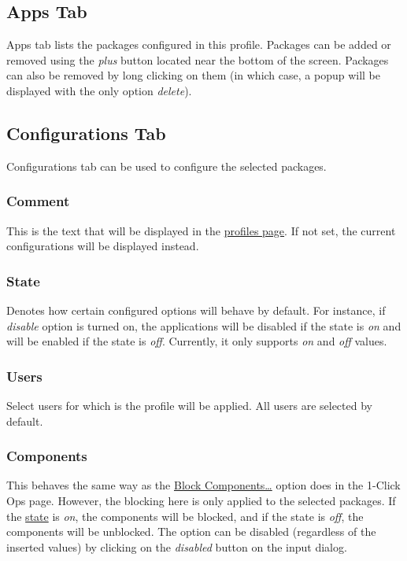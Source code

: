 \subsection{Apps Tab}\label{subsec:profile-apps-tab} %
Apps tab lists the packages configured in this profile. Packages can be added or removed using the \textit{plus}
button located near the bottom of the screen. Packages can also be removed by long clicking on them (in which case, a
popup will be displayed with the only option \textit{delete}).

\subsection{Configurations Tab}\label{subsec:profile-configurations-tab} %
Configurations tab can be used to configure the selected packages.

\subsubsection{Comment} %
This is the text that will be displayed in the \hyperref[sec:profiles-page]{profiles page}. If not set, the current
configurations will be displayed instead.

\subsubsection{State}\label{subsubsec:profile-state} %
Denotes how certain configured options will behave by default. For instance, if \textit{disable} option is turned on,
the applications will be disabled if the state is \textit{on} and will be enabled if the state is \textit{off}.
Currently, it only supports \textit{on} and \textit{off} values.

\subsubsection{Users} %
Select users for which is the profile will be applied. All users are selected by default.

\subsubsection{Components} %
This behaves the same way as the \hyperref[subsec:block-components-dots]{Block Components\dots} option does in the
1-Click Ops page. However, the blocking here is only applied to the selected packages.
If the \hyperref[subsubsec:profile-state]{state} is \textit{on}, the components will be blocked,
and if the state is \textit{off}, the components will be unblocked.
The option can be disabled (regardless of the inserted values) by clicking on the \textit{disabled} button on the input dialog.

